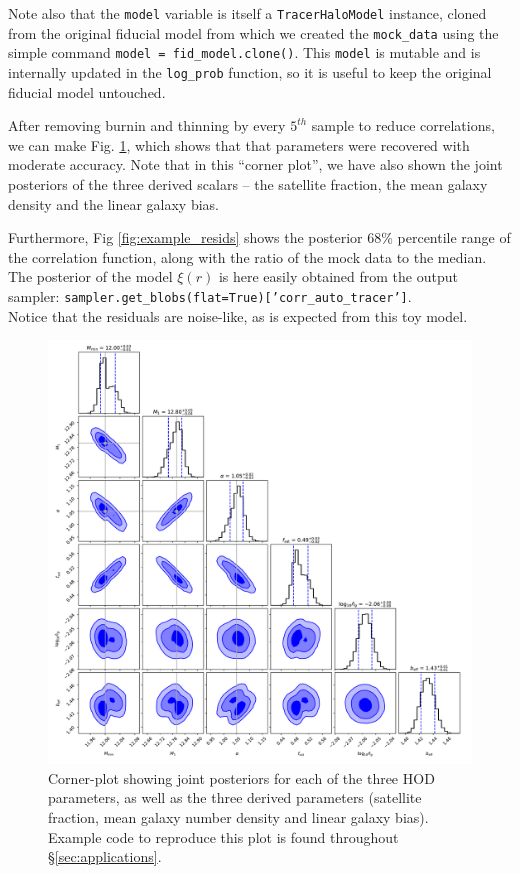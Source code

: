 \documentclass[5p,aas_macros]{elsarticle}
\begin{document}
Note also that the \verb|model| variable is itself a \texttt{Tracer\-Halo\-Model} instance, cloned from the original fiducial model from which we created the \verb|mock_data| using the simple command \texttt{model = fid\_model.clone()}. 
This \verb|model| is mutable and is internally updated in the \verb|log_prob| function, so it is useful to keep the original fiducial model untouched.

After removing burnin and thinning by every $5^{th}$ sample to reduce correlations, we can make Fig. \ref{fig:example1_corner}, which shows that that parameters were recovered with moderate accuracy. 
Note that in this ``corner plot'', we have also shown the joint posteriors of the three derived scalars -- the satellite fraction, the mean galaxy density and the linear galaxy bias.  

Furthermore, Fig \ref{fig:example_resids} shows the posterior 68\%  percentile range of the correlation function, along with the ratio of the mock data to the median. The posterior of the model $\xi(r)$ is here easily obtained from the output sampler: \texttt{sampler.get\_blobs(flat=True)['corr\_auto\_tracer']}. \\
Notice that the residuals are noise-like, as is expected from this toy model.

\begin{figure}
    \centering
    \includegraphics[width=\textwidth]{figures/default_corner.pdf}
    \caption{Corner-plot showing joint posteriors for each of the three HOD parameters, as well as the three derived parameters (satellite fraction, mean galaxy number density and linear galaxy bias). Example code to reproduce this plot is found throughout \S\ref{sec:applications}. }
    \label{fig:example1_corner}
\end{figure}
\end{document}
